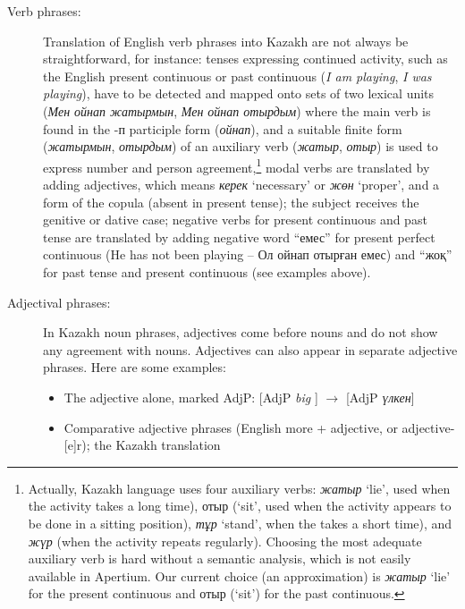 \documentclass[11pt]{article}
\begin{document}
\begin{description}
\begin{itemize}
    \end{itemize}
\item[Verb phrases:] Translation of English verb phrases into Kazakh  are not always be straightforward, for instance: 
tenses expressing continued activity, such as the 
  English present continuous or past continuous (\emph{I am playing}, \emph{I was playing}), have to be detected and 
  mapped onto sets of two lexical units (\emph{Мен ойнап жатырмын}, \emph{Мен ойнап отырдым}) where the main verb is 
  found in the -п participle form (\emph{ойнап}), and a suitable finite form  (\emph{жатырмын}, \emph{отырдым}) of an auxiliary 
  verb (\emph{жатыр}, \emph{отыр}) is used to express number and person agreement,\footnote{Actually, Kazakh language uses four auxiliary verbs: \emph{жатыр} `lie', 
      used when the activity takes a long time), отыр (`sit', used when the activity appears to be done in a sitting position), \emph{тұр} `stand', 
      when the takes a short time), and \emph{жүр} (when the activity repeats regularly). Choosing the most adequate auxiliary verb is 
      hard without a semantic analysis, which is not easily available in Apertium. Our current choice (an approximation) 
      is \emph{жатыр} `lie' for the present continuous and отыр (`sit') for the past continuous.} 
  modal verbs are translated by adding adjectives, which means \emph{керек} `necessary' or \emph{жөн} `proper', 
  and a form of the copula (absent in present tense); the subject receives the genitive or dative case; negative 
  verbs for present continuous and past tense are translated by adding negative word ``емес'' for present 
  perfect continuous (He has not been playing -- Ол ойнап отырған емес) and  ``жоқ'' for past tense and 
  present continuous (see examples above).
\item[Adjectival phrases:] In Kazakh noun phrases, adjectives come before nouns and do not show any agreement 
  with nouns.  Adjectives can also appear in separate adjective phrases. Here are some examples:
\begin{itemize}
\item The adjective alone, marked AdjP: [AdjP \emph{big} ] $\rightarrow$ [AdjP \emph{үлкен}] 
\item Comparative adjective phrases  (English more + adjective, or adjective-[e]r); the Kazakh translation 

\end{itemize}
\end{description}
\end{document}
